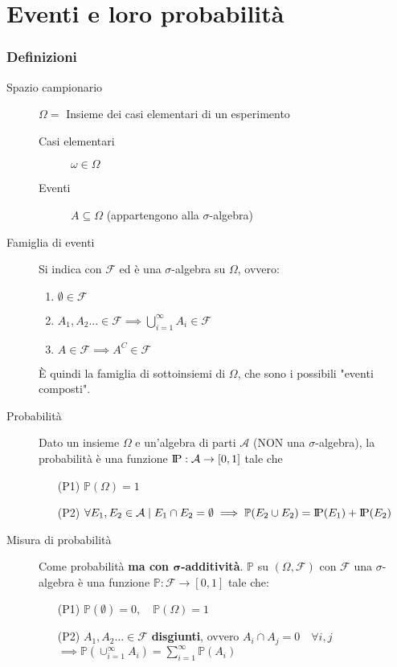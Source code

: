 \documentclass[a4paper,10pt]{article}
\newcommand{\ssubset}{\subseteq}
\newcommand{\pr}{\text{I\kern-0.15em P}} %
\theoremstyle{remark}
\theoremstyle{definition}
\begin{document}
\newpage

\part{Eventi e loro probabilità}
\section*{Definizioni}
\begin{description}
    \item[Spazio campionario]$\Omega=$ Insieme dei casi elementari di un esperimento
    \begin{description}
        \item[Casi elementari] $\omega \in \Omega$
        \item[Eventi] $A\ssubset\Omega$ (appartengono alla $\sigma$-algebra)
    \end{description}
    \item[Famiglia di eventi] Si indica con $\mathcal{F}$ ed è una $\sigma$-algebra su $\Omega$, ovvero:
    \begin{enumerate}
        \item $\emptyset \in \mathcal{F}$
        \item $A_1,A_2...\in \mathcal{F} \implies \bigcup_{i=1}^\infty A_i \in \mathcal{F}$
        \item $A\in \mathcal{F} \implies A^C \in \mathcal{F}$ 
    \end{enumerate}
    È quindi la famiglia di sottoinsiemi di $\Omega$, che sono i possibili "eventi composti". 

\item[Probabilità]  Dato un insieme $\Omega$ e un'algebra di parti $\mathcal{A}$ (NON una $\sigma$-algebra), la probabilità è una funzione $\pr:\mathcal{A}\to [0,1]$ tale che
    \begin{itemize}
        \item[(P1)] $\mathbb{P}(\Omega)=1$
        \item[(P2)] $\forall E_1,E_2\in \mathcal{A} \mid E_1\cap E_2 = \emptyset\implies \mathbb{P}(E_2\cup E_2)=\pr(E_1)+\pr(E_2)$
    \end{itemize}
    
    \item[Misura di probabilità] Come probabilità \textbf{ma con $\pmb{\sigma}$-additività}. $\mathbb{P}$ su $(\Omega, \mathcal{F})$ con $\mathcal{F}$ una $\sigma$-algebra è  una funzione $\mathbb{P}: \mathcal{F} \to [0, 1]$ tale che:
    \begin{itemize}
        \item[(P1)] $\mathbb{P}(\emptyset)=0, \quad \mathbb{P}(\Omega)=1$
        \item[(P2)] $A_1,A_2...\in \mathcal{F}$ \textbf{disgiunti}, ovvero $A_i \cap A_j =0 \quad \forall i,j$ $\implies \mathbb{P}(\cup_{i=1}^\infty A_i)=\sum_{i=1}^\infty \mathbb{P}(A_i)$
    \end{itemize}
    

\end{description}
\end{document}
